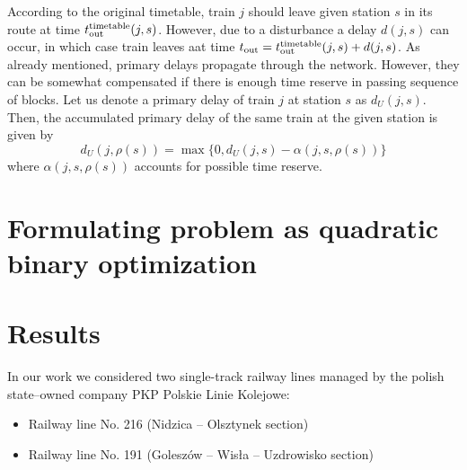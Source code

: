 According to the original timetable, train $j$ should leave given station $s$ in its route at time
 $t_\text{out}^\text{timetable}(j, s)$. However, due to a disturbance a delay $d(j, s)$ can occur, in which case train
 leaves aat time $t_\text{out} = t_\text{out}^\text{timetable}(j, s) + d(j, s)$. As already mentioned, primary delays propagate
 through the network. However, they can be somewhat compensated if there is enough time reserve
 in passing sequence of blocks. Let us denote a primary delay of train $j$ at station $s$ as
 $d_U(j, s)$. Then, the accumulated primary delay of the same train at the given station is
given by
\begin{equation}
    d_U(j, \rho(s)) = \max\{0, d_U(j, s) - \alpha(j, s, \rho(s))\}
\end{equation}
where $\alpha(j, s, \rho(s))$ accounts for possible time reserve.   
\section{Formulating problem as quadratic binary optimization}


\section{Results}
In our work we considered two single-track railway lines managed by the polish state--owned company
PKP Polskie Linie Kolejowe:

\begin{itemize}
    \item Railway line No. 216 (Nidzica -- Olsztynek section)
    \item Railway line No. 191 (Goleszów -- Wisła -- Uzdrowisko section)
\end{itemize}
